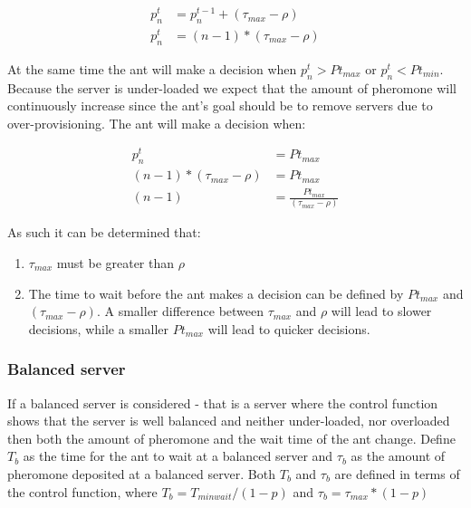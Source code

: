 \documentclass[conference]{IEEEtran}
\begin{document}
\begin{equation}
\begin{aligned}
p^{t}_{n} &= p^{t-1}_{n} + (\tau_{max} - \rho) \\
p^{t}_{n} &= (n - 1) * (\tau_{max} - \rho)
\end{aligned}
\end{equation}

At the same time the ant will make a decision when $p^{t}_{n} > Pt_{max}$ or $p^{t}_{n} < Pt_{min}$. Because the server is under-loaded we expect that the amount of pheromone will continuously increase since the ant's goal should be to remove servers due to over-provisioning. The ant will make a decision when:

\begin{equation}
\begin{aligned}
p^{t}_{n} &= Pt_{max} \\
(n - 1) * (\tau_{max} - \rho) &= Pt_{max} \\
(n - 1) &= \frac{Pt_{max}}{(\tau_{max} - \rho)} 
\end{aligned}
\end{equation}

As such it can be determined that:

\begin{enumerate}
	\item $\tau_{max}$ must be greater than $\rho$
	\item The time to wait before the ant makes a decision can be defined by $Pt_{max}$ and $(\tau_{max} - \rho)$. A smaller difference between $\tau_{max}$ and $\rho$ will lead to slower decisions, while a smaller $Pt_{max}$ will lead to quicker decisions.
\end{enumerate}

\subsubsection{Balanced server}

If a balanced server is considered - that is a server where the control function shows that the server is well balanced and neither under-loaded, nor overloaded then both the amount of pheromone and the wait time of the ant change. Define $T_{b}$ as the time for the ant to wait at a balanced server and $\tau_{b}$ as the amount of pheromone deposited at a balanced server. Both $T_{b}$ and $\tau_{b}$ are defined in terms of the control function, where $T_{b} = T_{minwait} / (1 - p)$ and $\tau_{b} = \tau_{max} * (1 - p)$
\end{document}
